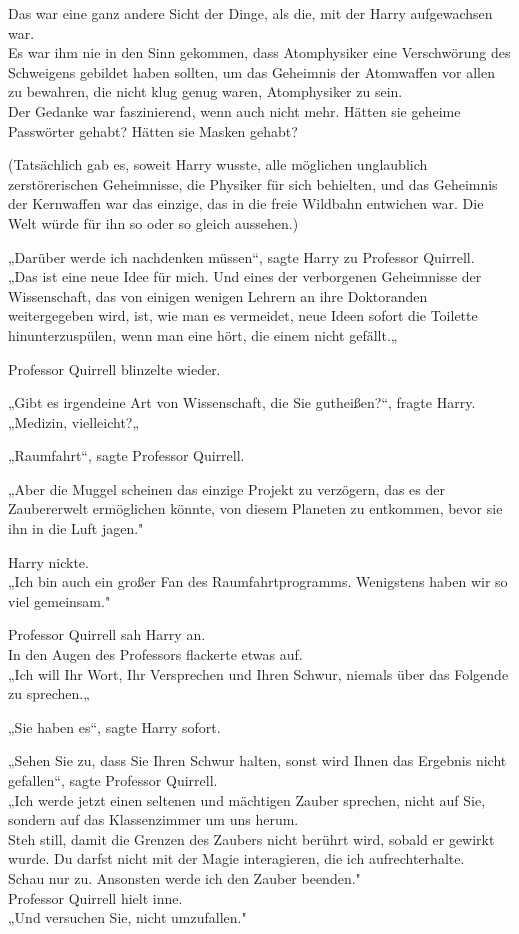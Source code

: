 {Das war eine ganz andere Sicht der Dinge, als die, mit der Harry aufgewachsen war.\\ Es war ihm nie in den Sinn gekommen, dass Atomphysiker eine Verschwörung des Schweigens gebildet haben sollten, um das Geheimnis der Atomwaffen vor allen zu bewahren, die nicht klug genug waren, Atomphysiker zu sein.\\ Der Gedanke war faszinierend, wenn auch nicht mehr. Hätten sie geheime Passwörter gehabt? Hätten sie Masken gehabt?

(Tatsächlich gab es, soweit Harry wusste, alle möglichen unglaublich zerstörerischen Geheimnisse, die Physiker für sich behielten, und das Geheimnis der Kernwaffen war das einzige, das in die freie Wildbahn entwichen war. Die Welt würde für ihn so oder so gleich aussehen.)

„Darüber werde ich nachdenken müssen“, sagte Harry zu Professor Quirrell.\\ „Das ist eine neue Idee für mich. Und eines der verborgenen Geheimnisse der Wissenschaft, das von einigen wenigen Lehrern an ihre Doktoranden weitergegeben wird, ist, wie man es vermeidet, neue Ideen sofort die Toilette hinunterzuspülen, wenn man eine hört, die einem nicht gefällt.„

Professor Quirrell blinzelte wieder.

„Gibt es irgendeine Art von Wissenschaft, die Sie gutheißen?“, fragte Harry.\\ „Medizin, vielleicht?„

„Raumfahrt“, sagte Professor Quirrell.

„Aber die Muggel scheinen das einzige Projekt zu verzögern, das es der Zaubererwelt ermöglichen könnte, von diesem Planeten zu entkommen, bevor sie ihn in die Luft jagen."

Harry nickte.\\ „Ich bin auch ein großer Fan des Raumfahrtprogramms. Wenigstens haben wir so viel gemeinsam."

Professor Quirrell sah Harry an.\\ In den Augen des Professors flackerte etwas auf.\\ „Ich will Ihr Wort, Ihr Versprechen und Ihren Schwur, niemals über das Folgende zu sprechen.„

„Sie haben es“, sagte Harry sofort.

„Sehen Sie zu, dass Sie Ihren Schwur halten, sonst wird Ihnen das Ergebnis nicht gefallen“, sagte Professor Quirrell.\\ „Ich werde jetzt einen seltenen und mächtigen Zauber sprechen, nicht auf Sie, sondern auf das Klassenzimmer um uns herum.\\ Steh still, damit die Grenzen des Zaubers nicht berührt wird, sobald er gewirkt wurde. Du darfst nicht mit der Magie interagieren, die ich aufrechterhalte.\\ Schau nur zu. Ansonsten werde ich den Zauber beenden."\\ Professor Quirrell hielt inne.\\ „Und versuchen Sie, nicht umzufallen."

}
